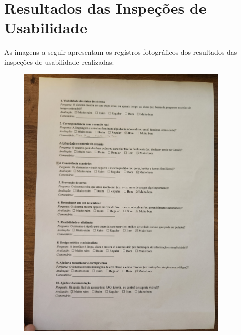 
\chapter{Resultados das Inspeções de Usabilidade}

As imagens a seguir apresentam os registros fotográficos dos resultados das inspeções de usabilidade realizadas:

\begin{figure}[H]
    \centering
    \includegraphics[width=0.9\textwidth]{sections/appendix/resultados_inspecao_usabilidade/1 (1).jpg}

\end{figure}
